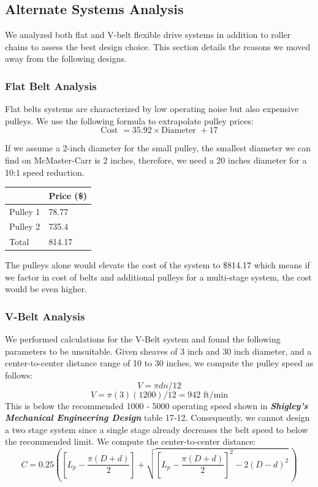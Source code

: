 \documentclass[letterpaper,12pt]{article}
\begin{document}
\subsection{Alternate Systems Analysis}
We analyzed both flat and V-belt flexible drive systems in addition to roller chains to assess the best design choice. This section details the reasons we moved away from the following designs. 
\subsubsection{Flat Belt Analysis}
Flat belts systems are characterized by low operating noise but also  expensive pulleys. We use the following formula to extrapolate pulley prices:
\begin{equation}
\text{Cost }=35.92 \times \text{Diameter }+17
\end{equation}

\noindent If we assume a 2-inch diameter for the small pulley, the smallest diameter we can find on McMaster-Carr is 2 inches, therefore, we need a 20 inches diameter for a 10:1 speed reduction. 
\begin{center}
	\begin{tabular}{ |p{3cm}|p{4cm}| }
		\hline
		& Price (\$) \\
		\hline
		Pulley 1 & 78.77\\
		\hline
		Pulley 2 & 735.4\\
		\hline
		Total & 814.17\\
		\hline
	\end{tabular}
\end{center}

\noindent The pulleys alone would elevate the cost of the system to \$814.17 which means if we factor in cost of belts and additional pulleys for a multi-stage system, the cost would be even higher.

\subsubsection{V-Belt Analysis}
We performed calculations for the V-Belt system and found the following parameters to be unsuitable. Given sheaves of 3 inch and 30 inch diameter, and a center-to-center distance range of 10 to 30 inches, we compute the pulley speed as follows:
\begin{equation}
    V = \pi dn/12
\end{equation}
$$V = \pi(3)(1200)/12 = 942 \text{ ft/min}$$
This is below the recommended 1000 - 5000 operating speed shown in \textbf{\textit{Shigley's Mechanical Engineering Design}} table 17-12. Consequently, we cannot design a two stage system since a single stage already decreases the belt speed to below the recommended limit. 
We compute the center-to-center distance:
\begin{equation}
    C = 0.25 \left(\left[L_p - \frac{\pi(D+d)}{2}\right]+\sqrt{\left[L_p - \frac{\pi(D+d)}{2}\right]^2-2(D-d)^2}\,\right)
\end{equation}
\end{document}
